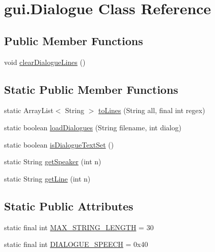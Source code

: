 \hypertarget{classgui_1_1_dialogue}{}\section{gui.\+Dialogue Class Reference}
\label{classgui_1_1_dialogue}
\subsection*{Public Member Functions}
\begin{DoxyCompactItemize}
\item 
void \mbox{\hyperlink{classgui_1_1_dialogue_aaa643e4f8b14c6734f4d39d01049e850}{clear\+Dialogue\+Lines}} ()
\end{DoxyCompactItemize}
\subsection*{Static Public Member Functions}
\begin{DoxyCompactItemize}
\item 
static Array\+List$<$ String $>$ \mbox{\hyperlink{classgui_1_1_dialogue_a6460a4797c6ca33824d8e548489bf722}{to\+Lines}} (String all, final int regex)
\item 
static boolean \mbox{\hyperlink{classgui_1_1_dialogue_a05d9e1fa1c276d33a40b5321d2e6d594}{load\+Dialogues}} (String filename, int dialog)
\item 
static boolean \mbox{\hyperlink{classgui_1_1_dialogue_a9ac45a6b6c4dd6e20f3ea3ad0af2b4b9}{is\+Dialogue\+Text\+Set}} ()
\item 
static String \mbox{\hyperlink{classgui_1_1_dialogue_a38d0eafda7f6ef2ac00de87acd23ab8e}{get\+Speaker}} (int n)
\item 
static String \mbox{\hyperlink{classgui_1_1_dialogue_acfaf19a365093cef7abd63b2bb4e6f4f}{get\+Line}} (int n)
\end{DoxyCompactItemize}
\subsection*{Static Public Attributes}
\begin{DoxyCompactItemize}
\item 
static final int \mbox{\hyperlink{classgui_1_1_dialogue_a93e1652100d34187a3c0bbf5ac3b4dca}{M\+A\+X\+\_\+\+S\+T\+R\+I\+N\+G\+\_\+\+L\+E\+N\+G\+TH}} = 30
\item 
static final int \mbox{\hyperlink{classgui_1_1_dialogue_a4cc16d7f84aecd1afefd997c6bcd25e0}{D\+I\+A\+L\+O\+G\+U\+E\+\_\+\+S\+P\+E\+E\+CH}} = 0x40
\end{DoxyCompactItemize}
